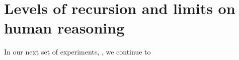 \section{Levels of recursion and limits on human reasoning}
\label{sec:levels}

In our next set of experiments, , we continue to 